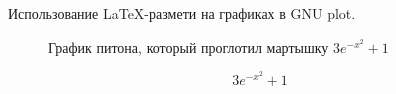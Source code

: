 \documentclass{article}
\begin{document}
Использование LaTeX-размети на графиках в GNU plot.
\begin{figure}[!ht]
\begin{center}

\end{center}
\caption{График питона, который проглотил мартышку $3e^{-x^{2}}+1$}
\end{figure}

\begin{equation}
3e^{-x^{2}}+1
\end{equation}
\end{document}

